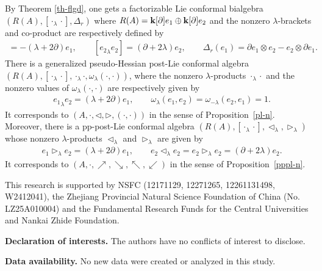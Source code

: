 \documentclass[12pt]{amsart}
\begin{document}
\begin{example}
    By Theorem \ref{th-flgd}, one gets a factorizable Lie conformal bialgebra $( R(A),[\cdot_\lambda\cdot],\Delta_r)$ where $R(A)={\bf k}[\partial]e_1\oplus {\bf k}[\partial]e_2$ and the nonzero $\lambda$-brackets and co-product are respectively
     defined by
    \begin{align*}
        [{e_1}_\lambda e_2]=-(\lambda+2\partial)e_1,\qquad [{e_2}_\lambda e_2]=(\partial+2\lambda)e_2,\qquad
        \Delta_r(e_1)=\partial e_1\otimes e_2-e_2\otimes \partial e_1. %
    \end{align*}
 There is a generalized pseudo-Hessian post-Lie conformal algebra $(R(A),[\cdot_\lambda\cdot],\cdot_\lambda\cdot,\omega_\lambda(\cdot,\cdot))$, where the  nonzero $\lambda$-products $\cdot_\lambda\cdot$ and
 the nonzero values of $\omega_\lambda(\cdot,\cdot)$
 are  respectively given by
        \begin{align*}
        &{e_1}_\lambda e_2=(\lambda+2\partial)e_1,\qquad \omega_\lambda (e_1,e_2)=\omega_{-\lambda}(e_2,e_1)=1.
    \end{align*}
It corresponds to $(A,\cdot,\lhd,\rhd,(\cdot,\cdot))$ in the sense
of Proposition~\ref{pl-n}. Moreover, there is  a pp-post-Lie
conformal algebra
$(R(A),[\cdot_\lambda\cdot],\lhd_\lambda,\rhd_\lambda)$ whose
nonzero $\lambda$-products $\lhd_\lambda$ and $\rhd_\lambda$ are
given by
    \begin{align*}
        &{e_1}\rhd_\lambda e_2=(\lambda+2\partial)e_1,\qquad e_2\lhd_\lambda e_2=e_2\rhd_\lambda e_2=(\partial+2\lambda)e_2.
    \end{align*}
It corresponds to $(A,\cdot,\nearrow,\searrow,\nwarrow,\swarrow)$
in the sense of Proposition~\ref{pppl-n}.
\end{example}
 This research is supported by
NSFC (12171129, 12271265, 12261131498, W2412041),  the Zhejiang
Provincial Natural Science Foundation of China (No. LZ25A010004)
and the Fundamental Research Funds for the Central Universities and Nankai Zhide Foundation.

\smallskip

\noindent
{\bf Declaration of interests. } The authors have no conflicts of interest to disclose.

\smallskip

\noindent
{\bf Data availability. } No new data were created or analyzed in this study.
\end{document}

